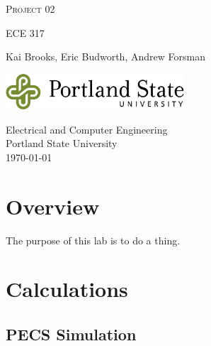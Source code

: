 \documentclass[a4paper,12pt]{article}
\begin{document}

\begin{titlepage}
	\begin{center}
		\vspace*{1cm}

		\huge\textsc{Project 02}

		\vspace{0.5cm}
		\small\textsc{ECE 317}
		
		\vspace{1.5cm}
		\normalsize Kai Brooks, Eric Budworth, Andrew Forsman
		
		\vspace{0.5cm}
		
		\vfill
		\vspace{0.8cm}
		
		\includegraphics[width=0.5\textwidth]{images/psulogo_horiz_msword.tif}
		
		\vspace{0.5cm}
		Electrical and Computer Engineering\\
		Portland State University\\
		\today
		 
	\end{center}
\end{titlepage}

\newpage
\tableofcontents


\newpage
{}

\section{Overview}
The purpose of this lab is to do a thing.

\section{Calculations}
	\subsection{PECS Simulation}
\end{document}
